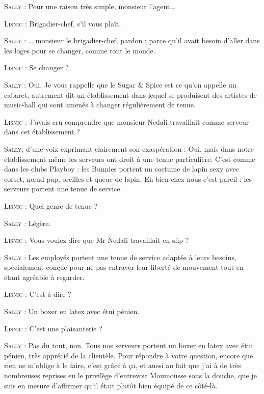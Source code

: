 \begin{dialogue}
\textsc{Sally} : Pour une raison très simple, monsieur l’agent…

\textsc{Lisnic} : Brigadier-chef, s’il vous plaît.

\textsc{Sally} : … monsieur le brigadier-chef, pardon : parce qu’il avait besoin d’aller dans les loges pour se changer, comme tout le monde.

\textsc{Lisnic} : Se changer ?

\textsc{Sally} : Oui. Je vous rappelle que le Sugar \& Spice est ce qu’on appelle un cabaret, autrement dit un établissement dans lequel se produisent des artistes de music-hall qui sont amenés à changer régulièrement de tenue.

\textsc{Lisnic} : J’avais cru comprendre que monsieur Nedali travaillait comme serveur dans cet établissement ?

\textsc{Sally}, d’une voix exprimant clairement son exaspération : Oui, mais dans notre établissement même les serveurs ont droit à une tenue particulière. C’est comme dans les clubs Playboy : les Bunnies portent un costume de lapin sexy avec corset, nœud pap, oreilles et queue de lapin. Eh bien chez nous c’est pareil : les serveurs portent une tenue de service.

\textsc{Lisnic} : Quel genre de tenue ?

\textsc{Sally} : Légère.

\textsc{Lisnic} : Vous voulez dire que Mr Nedali travaillait en slip ?

\textsc{Sally} : Les employés portent une tenue de service adaptée à leurs besoins, spécialement conçue pour ne pas entraver leur liberté de mouvement tout en étant agréable à regarder.

\textsc{Lisnic} : C’est-à-dire ?

\textsc{Sally} : Un boxer en latex avec étui pénien.

%
%
%
\textsc{Lisnic} : C’est une plaisanterie ?

\textsc{Sally} : Pas du tout, non. Tous nos serveurs portent un boxer en latex avec étui pénien, très apprécié de la clientèle. Pour répondre à votre question, encore que rien ne m’oblige à le faire, c’est grâce à ça, et aussi au fait que j’ai à de très nombreuses reprises eu le privilège d’entrevoir Moumousse sous la douche, que je suis en mesure d’affirmer qu’il était plutôt bien équipé de ce côté-là.


\end{dialogue}
